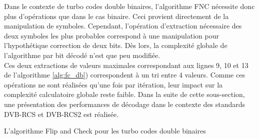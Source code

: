 Dans le contexte de turbo codes double binaires, l'algorithme FNC nécessite donc plus d'opérations que dans le cas binaire.
Ceci provient directement de la manipulation de symboles. Cependant, l'opération d'extraction nécessaire des deux symboles 
les plus probables correspond à une manipulation pour l'hypothétique correction de deux bits. Dès lors, la complexité globale
de l'algorithme par bit décodé n'est que peu modifiée.\\
Ces deux extractions de valeurs maximales correspondant aux lignes 9, 10 et 13 de l'algorithme \ref{alg:fc_db}) 
correspondent à un tri entre 4 valeurs.
Comme ces opérations
ne sont réalisées qu'une fois par itération, leur impact sur la complexité calculatoire globale reste faible. Dans la suite de 
cette sous-section, une présentation
des performances de décodage dans le contexte des standards DVB-RCS et DVB-RCS2 est réalisée.
\begin{center}
\begin{minipage}{.95\textwidth}%
\begin{algorithm}[H]
\label{alg:fc_db}
	\DontPrintSemicolon
	
	\;
	\caption{L'algorithme Flip and Check pour les turbo codes double binaires}
\end{algorithm}
\end{minipage}
\end{center}


